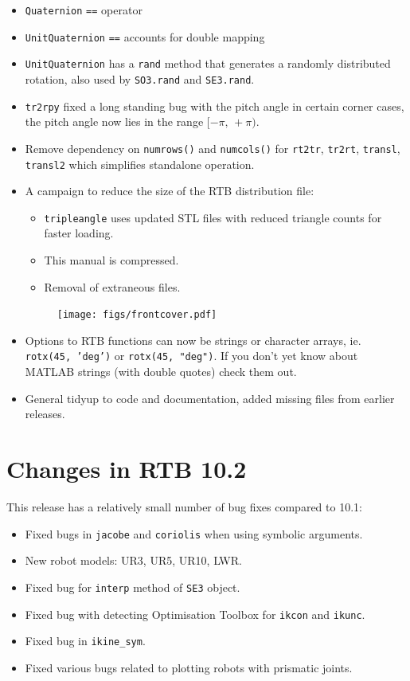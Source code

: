 \documentclass[a4paper,twoside]{report}
\begin{document}
\begin{itemize}
\item \texttt{Quaternion} \texttt{==} operator
\item  \texttt{UnitQuaternion}  \texttt{==}  accounts for double mapping
\item \texttt{UnitQuaternion} has a \texttt{rand} method that generates a randomly distributed rotation,  also used by \texttt{SO3.rand} and  \texttt{SE3.rand}.
\item \texttt{tr2rpy} fixed a long standing bug with the pitch angle in certain corner cases, the pitch angle now lies in the range $[-\pi, \,+\pi)$.

\item Remove dependency on \texttt{numrows()} and \texttt{numcols()} for \texttt{rt2tr}, \texttt{tr2rt}, \texttt{transl}, \texttt{transl2} which simplifies standalone operation.

\item A campaign to reduce the size of the RTB distribution file:
\begin{itemize}
	\item \texttt{tripleangle} uses updated STL files with reduced triangle counts for faster loading.
	\item This manual is compressed.
	\item Removal of extraneous files.
\end{itemize}
\begin{figure}
\vspace{-2ex}\texttt{[image: figs/frontcover.pdf]}
\end{figure}

\item Options to RTB functions can now be strings or character arrays, ie. \texttt{rotx(45, 'deg')} or \texttt{rotx(45, "deg")}.  If you don't yet know about MATLAB strings (with double quotes) check them out.
\item General tidyup to code and documentation, added missing files from earlier releases.
\end{itemize}

\section{Changes in RTB 10.2}
This release has a relatively small number of bug fixes compared to 10.1:
\begin{itemize}
\item Fixed bugs in \texttt{jacobe} and \texttt{coriolis} when using symbolic arguments.
\item New robot models: UR3, UR5, UR10, LWR.
\item Fixed bug for \texttt{interp} method of \texttt{SE3} object.
\item Fixed bug with detecting Optimisation Toolbox for \texttt{ikcon} and \texttt{ikunc}.
\item Fixed bug in \texttt{ikine\_sym}.
\item Fixed various bugs related to plotting robots with prismatic joints.
\end{itemize}
\end{document}
